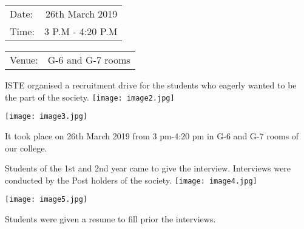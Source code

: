 \documentclass[12pt, a4 paper]{article}
\begin{document}
\begin{center}
\begin{multicols}{2}
\begin{tabular}{l r}
Date: & 26th March 2019 \\ %
Time: & 3 P.M - 4:20 P.M \\ %
\end{tabular}
\columnbreak
\begin{tabular}{l r}
Venue: & G-6 and G-7 rooms \\ %
\end{tabular}
\end{multicols}

\begin{Large}
\begin{multicols}{2}
ISTE organised a recruitment drive for the students who eagerly wanted to be the part of the society.
\columnbreak
\texttt{[image: image2.jpg]}
\end{multicols}

\begin{multicols}{2}

\texttt{[image: image3.jpg]}

\columnbreak
It took place on 26th March 2019 from 3 pm-4:20 pm in G-6 and G-7 rooms of our college.
\end{multicols}

\newpage 


\begin{multicols}{2}
Students of the 1st and 2nd year came to give the interview. Interviews were conducted by the Post holders of the society.
\columnbreak
\texttt{[image: image4.jpg]}
  
\end{multicols}

\begin{multicols}{2}
\texttt{[image: image5.jpg]}

\columnbreak
Students were given a resume to fill prior the interviews.
  

\end{multicols}
\end{Large}
\end{center}
\end{document}
